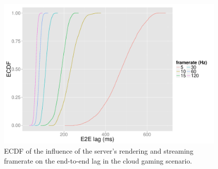 \begin{figure}[!t]
	\centering
	\includegraphics[width=1.0\columnwidth]{../simulation/visualization/cloudgaming-lag-cdf.pdf}
	\caption{\acrshort{ECDF} of the influence of the server's rendering and streaming framerate on the end-to-end lag in the cloud gaming scenario.}
\label{fig:cloud-e2e-delay-sim}
\end{figure}











